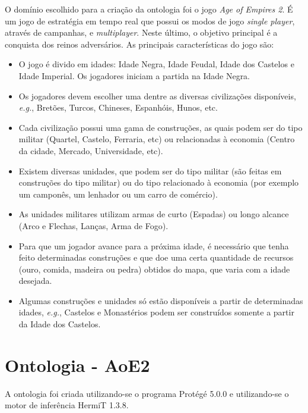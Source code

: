 \documentclass[10pt,a4paper]{article}
\begin{document}
O domínio escolhido para a criação da ontologia foi o jogo \emph{Age of Empires 2}. É um jogo de estratégia em tempo real que possui os modos de jogo \emph{single player}, através de campanhas, e \emph{multiplayer}. Neste último, o objetivo principal é a conquista dos reinos adversários. As principais características do jogo são:
%
\begin{itemize}
    \item O jogo é divido em idades: Idade Negra, Idade Feudal, Idade dos Castelos e Idade Imperial. Os jogadores iniciam a partida na Idade Negra.
    \item Os jogadores devem escolher uma dentre as diversas civilizações disponíveis, \emph{e.g.}, Bretões, Turcos, Chineses, Espanhóis, Hunos, etc.
    \item Cada civilização possui uma gama de construções, as quais podem ser do tipo militar (Quartel, Castelo, Ferraria, etc) ou relacionadas à economia (Centro da cidade, Mercado, Universidade, etc).
    \item Existem diversas unidades, que podem ser do tipo militar (são feitas em construções do tipo militar) ou do tipo relacionado à economia (por exemplo um camponês, um lenhador ou um carro de comércio).
    \item As unidades militares utilizam armas de curto (Espadas) ou longo alcance (Arco e Flechas, Lanças, Arma de Fogo).
    \item Para que um jogador avance para a próxima idade, é necessário que tenha feito determinadas construções e que doe uma certa quantidade de recursos (ouro, comida, madeira ou pedra) obtidos do mapa, que varia com a idade desejada.
    \item Algumas construções e unidades só estão disponíveis a partir de determinadas idades, \emph{e.g.}, Castelos e Monastérios podem ser construídos somente a partir da Idade dos Castelos.

\end{itemize}



\section{Ontologia - AoE2}

A ontologia foi criada utilizando-se o programa Protégé 5.0.0 e utilizando-se o motor de inferência HermiT 1.3.8.
\end{document}
